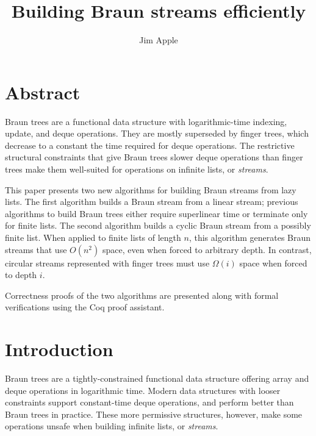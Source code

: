 \documentclass{llncs}
\begin{document}
\title{Building Braun streams efficiently}

\author{Jim Apple}

\institute{}

\maketitle

\section*{Abstract}

Braun trees are a functional data structure with logarithmic-time indexing, update, and deque operations.\cite{hoogerwoord}
They are mostly superseded by finger trees, which decrease to a constant the time required for deque operations.\cite{kaplan96purely,HinzePat}
The restrictive structural constraints that give Braun trees slower deque operations than finger trees make them well-suited for operations on infinite lists, or {\em streams}.

This paper presents two new algorithms for building Braun streams from lazy lists.
The first algorithm builds a Braun stream from a linear stream; previous algorithms to build Braun trees either require superlinear time or terminate only for finite lists.\cite{okasakiBraun} 
The second algorithm builds a cyclic Braun stream from a possibly finite list. 
When applied to finite lists of length $n$, this algorithm generates Braun streams that use $O(n^2)$ space, even when forced to arbitrary depth.
In contrast, circular streams represented with finger trees must use $\Omega(i)$ space when forced to depth $i$.

Correctness proofs of the two algorithms are presented along with formal verifications using the Coq proof assistant.

\section{Introduction}

Braun trees are a tightly-constrained functional data structure offering array and deque operations in logarithmic time.\cite{hoogerwoord,okasakiBraun} 
Modern data structures with looser constraints support constant-time deque operations, and perform better than Braun trees in practice.\cite{okasakiSkewLists}
These more permissive structures, however, make some operations unsafe when building infinite lists, or {\em streams}.
\end{document}
